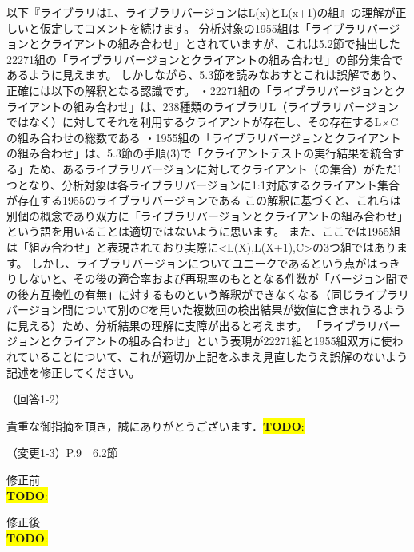 \documentclass{jarticle} %
\newcommand{\todo}[1]{\colorbox{yellow}{{\bf TODO}:}{\color{red}{\textbf{[#1]}}}}
\def\subsection#1{ \vspace{1pc} {\gt #1} }
\begin{document}
以下『ライブラリはL、ライブラリバージョンはL(x)とL(x+1)の組』の理解が正しいと仮定してコメントを続けます。
分析対象の1955組は「ライブラリバージョンとクライアントの組み合わせ」とされていますが、これは5.2節で抽出した22271組の「ライブラリバージョンとクライアントの組み合わせ」の部分集合であるように見えます。
しかしながら、5.3節を読みなおすとこれは誤解であり、正確には以下の解釈となる認識です。
・22271組の「ライブラリバージョンとクライアントの組み合わせ」は、238種類のライブラリL（ライブラリバージョンではなく）に対してそれを利用するクライアントが存在し、その存在するL×Cの組み合わせの総数である
・1955組の「ライブラリバージョンとクライアントの組み合わせ」は、5.3節の手順(3)で「クライアントテストの実行結果を統合する」ため、あるライブラリバージョンに対してクライアント（の集合）がただ1つとなり、分析対象は各ライブラリバージョンに1:1対応するクライアント集合が存在する1955のライブラリバージョンである
この解釈に基づくと、これらは別個の概念であり双方に「ライブラリバージョンとクライアントの組み合わせ」という語を用いることは適切ではないように思います。
また、ここでは1955組は「組み合わせ」と表現されており実際に<L(X),L(X+1),C>の3つ組ではあります。
しかし、ライブラリバージョンについてユニークであるという点がはっきりしないと、その後の適合率および再現率のもととなる件数が「バージョン間での後方互換性の有無」に対するものという解釈ができなくなる（同じライブラリバージョン間について別のCを用いた複数回の検出結果が数値に含まれうるように見える）ため、分析結果の理解に支障が出ると考えます。
「ライブラリバージョンとクライアントの組み合わせ」という表現が22271組と1955組双方に使われていることについて、これが適切か上記をふまえ見直したうえ誤解のないよう記述を修正してください。


\subsection{（回答1-2）}

貴重な御指摘を頂き，誠にありがとうございます．\todo{hoge}


\subsection{（変更1-3）P.9　6.2節}
\vspace{-0.3cm}
\begin{description}
\item 修正前\\
\phantom{　}
\todo{hoge}
\vspace{-0.3cm}
\item 修正後\\
\phantom{　}
\todo{hoge}
\end{description}
\end{document}
